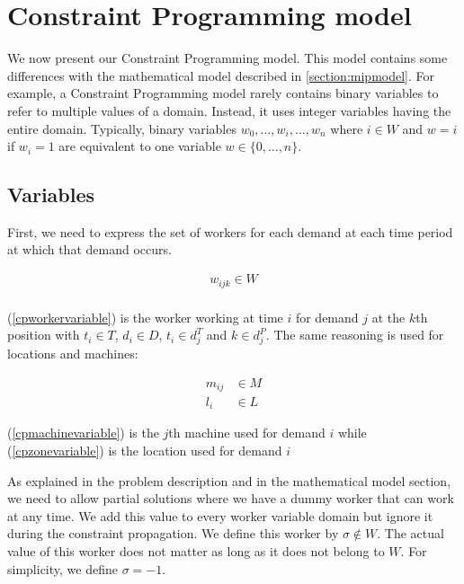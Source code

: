\documentclass[../../thesis.tex]{subfiles}
\begin{document}
\section{Constraint Programming model}
\label{section:cpmodel}

We now present our Constraint Programming model. This model contains some differences
with the mathematical model described in \autoref{section:mipmodel}.
For example, a Constraint Programming model rarely contains binary variables to refer to multiple values 
of a domain. Instead, it uses integer variables having the entire domain. 
Typically, binary variables $w_0, \dots, w_i, \dots, w_n$ where $i \in W$ and $w = i$ if $w_i = 1$ are equivalent to 
one variable $w \in \{0, \dots, n\}$.



\subsection{Variables}

First, we need to express the set of workers for each demand at each time period at which that demand occurs.

\begin{equation}
\begin{split}
    w_{ijk} \in W \label{cpworkervariable} \\
\end{split}
\end{equation}

(\ref{cpworkervariable}) is the worker working at time $i$ for demand $j$ at the $k$th position 
with $t_i \in T$, $d_i \in D$, $t_i \in d_j^T$ and $k \in d^P_j$. The same reasoning is used for locations and machines:

\begin{align}
    m_{ij} &\in M \label{cpmachinevariable} \\ 
    l_i &\in L \label{cpzonevariable} 
\end{align}

(\ref{cpmachinevariable}) is the $j$th machine used for demand $i$ while (\ref{cpzonevariable}) is the location used for demand $i$



As explained in the problem description and in the mathematical model section,
we need to allow partial solutions where we have a dummy worker that can work at any time.
We add this value to every worker variable domain but ignore it during the constraint propagation. We define 
this worker by $\sigma \notin W$. The actual value of this worker does not matter as long as it does not belong to $W$. For simplicity, we define $\sigma = -1$.
\end{document}

